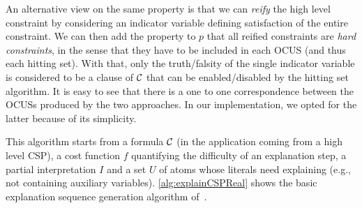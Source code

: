 {An alternative view on the same property is that we can \emph{reify} the high level constraint by considering an indicator variable defining satisfaction of the entire constraint. 
We can then add the property to $p$ that all reified constraints are \emph{hard constraints}, in the sense that they have to be included in each OCUS (and thus each hitting set). With that, only the truth/falsity of the single indicator variable is considered to be a clause of $\mathcal{C} $ that can be enabled/disabled by the hitting set algorithm. 
It is easy to see that there is a one to one correspondence between the OCUSs produced by the two approaches. In our implementation, we opted for the latter because of its simplicity. 
}

This algorithm starts from a formula $\mathcal{C} $ (in the application coming from a high level CSP), a cost function $f$ quantifying the difficulty of an explanation step, a partial interpretation $I$ and a set $U$ of atoms whose literals need explaining (e.g., not containing auxiliary variables). 
 \cref{alg:explainCSPReal} shows the basic explanation sequence generation algorithm of~\cite{ecai/BogaertsGCG20}. 





